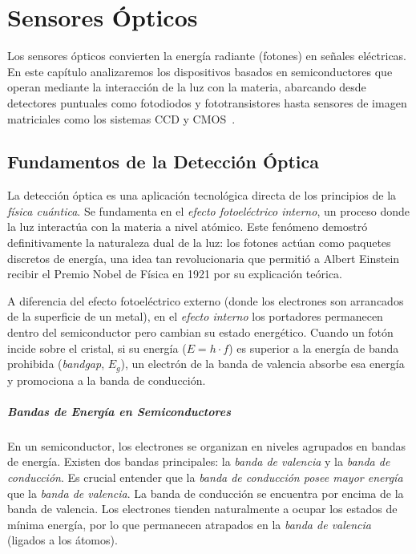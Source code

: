 
\chapter{Sensores Ópticos}\label{cap:opticos}

Los sensores ópticos convierten la energía radiante (fotones) en señales eléctricas. En este capítulo analizaremos los dispositivos basados en semiconductores que operan mediante la interacción de la luz con la materia, abarcando desde detectores puntuales como fotodiodos y fototransistores hasta sensores de imagen matriciales como los sistemas CCD y CMOS~\cite{fraden2015sensors}.

\section{Fundamentos de la Detección Óptica}\label{sec:fundamentos_opticos}

La detección óptica es una aplicación tecnológica directa de los principios de la \emph{física cuántica}. Se fundamenta en el \emph{efecto fotoeléctrico interno}, un proceso donde la luz interactúa con la materia a nivel atómico. Este fenómeno demostró definitivamente la naturaleza dual de la luz: los fotones actúan como paquetes discretos de energía, una idea tan revolucionaria que permitió a Albert Einstein recibir el Premio Nobel de Física en 1921 por su explicación teórica.


A diferencia del efecto fotoeléctrico externo (donde los electrones son arrancados de la superficie de un metal), en el \emph{efecto interno} los portadores permanecen dentro del semiconductor pero cambian su estado energético. Cuando un fotón incide sobre el cristal, si su energía ($E = h \cdot f$) es superior a la energía de banda prohibida (\textit{bandgap}, $E_g$), un electrón de la banda de valencia absorbe esa energía y promociona a la banda de conducción.

\paragraph{Bandas de Energía en Semiconductores}
En un semiconductor, los electrones se organizan en niveles agrupados en bandas de energía. Existen dos bandas principales: la \emph{banda de valencia} y la \emph{banda de conducción}. Es crucial entender que la \emph{banda de conducción posee mayor energía} que la \emph{banda de valencia}. La banda de conducción se encuentra por encima de la banda de valencia. Los electrones tienden naturalmente a ocupar los estados de mínima energía, por lo que permanecen atrapados en la \emph{banda de valencia} (ligados a los átomos). 

